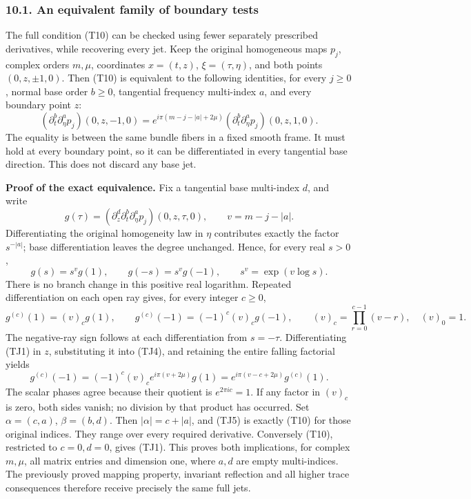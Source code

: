 \documentclass[
  11pt,
]{article}
\makeatletter
\let\ReaderOriginalAnchorStart\hyper@anchorstart
\let\ReaderOriginalAnchorEnd\hyper@anchorend
\let\ReaderPendingAliases\@empty
\def\ReaderArmAliases#1{\gdef\ReaderPendingAliases{#1}}
\def\hyper@anchorstart#1{\ReaderIfNativeAnchorTF{#1}{\ReaderPendingAliases\global\let\ReaderPendingAliases\@empty}{}\ReaderOriginalAnchorStart{#1}}
\makeatother
\begin{document}
\ReaderArmAliases{\ReaderOriginalAnchorStart{AN03-TR-JETS-001}\ReaderOriginalAnchorEnd\begingroup\expandafter\def\csname @currentHref\endcsname{AN03-TR-JETS-001}\label{AN03-TR-JETS-001}\endgroup\ReaderOriginalAnchorStart{an-equivalent-family-of-boundary-tests}\ReaderOriginalAnchorEnd}
\subsubsection{10.1. An equivalent family of boundary
tests}\label{an-equivalent-family-of-boundary-tests}

The full condition (T10) can be checked using fewer separately
prescribed derivatives, while recovering every jet. Keep the original
homogeneous maps \(p_j\), complex orders \(m,\mu\), coordinates
\(x=(t,z)\), \(\xi=(\tau,\eta)\), and both points \((0,z,\pm1,0)\). Then
(T10) is equivalent to the following identities, for every \(j\geq0\),
normal base order \(b\geq0\), tangential frequency multi-index \(a\),
and every boundary point \(z\): \[
 (\partial_t^b\partial_\eta^a p_j)(0,z,-1,0)
 =e^{i\pi(m-j-|a|+2\mu)}
   (\partial_t^b\partial_\eta^a p_j)(0,z,1,0).
 \tag{TJ1}
\] The equality is between the same bundle fibers in a fixed smooth
frame. It must hold at every boundary point, so it can be differentiated
in every tangential base direction. This does not discard any base jet.

\textbf{Proof of the exact equivalence.} Fix a tangential base
multi-index \(d\), and write \[
 g(\tau)=(\partial_z^d\partial_t^b\partial_\eta^a p_j)(0,z,\tau,0),
 \qquad v=m-j-|a|.
 \tag{TJ2}
\] Differentiating the original homogeneity law in \(\eta\) contributes
exactly the factor \(s^{-|a|}\); base differentiation leaves the degree
unchanged. Hence, for every real \(s>0\), \[
 g(s)=s^v g(1),\qquad g(-s)=s^v g(-1),
 \qquad s^v=\exp(v\log s).
 \tag{TJ3}
\] There is no branch change in this positive real logarithm. Repeated
differentiation on each open ray gives, for every integer \(c\geq0\), \[
 g^{(c)}(1)=(v)_c g(1),\qquad
 g^{(c)}(-1)=(-1)^c(v)_c g(-1),\qquad
 (v)_c=\prod_{r=0}^{c-1}(v-r),\quad(v)_0=1.
 \tag{TJ4}
\] The negative-ray sign follows at each differentiation from
\(s=-\tau\). Differentiating (TJ1) in \(z\), substituting it into (TJ4),
and retaining the entire falling factorial yields \[
 g^{(c)}(-1)=(-1)^c(v)_c e^{i\pi(v+2\mu)}g(1)
           =e^{i\pi(v-c+2\mu)}g^{(c)}(1).
 \tag{TJ5}
\] The scalar phases agree because their quotient is \(e^{2\pi i c}=1\).
If any factor in \((v)_c\) is zero, both sides vanish; no division by
that product has occurred. Set \(\alpha=(c,a)\), \(\beta=(b,d)\). Then
\(|\alpha|=c+|a|\), and (TJ5) is exactly (T10) for those original
indices. They range over every required derivative. Conversely (T10),
restricted to \(c=0,d=0\), gives (TJ1). This proves both implications,
for complex \(m,\mu\), all matrix entries and dimension one, where
\(a,d\) are empty multi-indices. The previously proved mapping property,
invariant reflection and all higher trace consequences therefore receive
precisely the same full jets.
\end{document}
